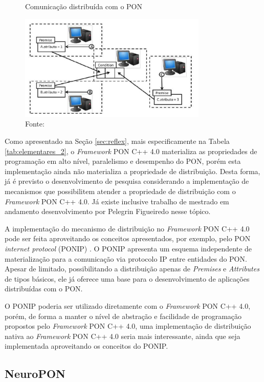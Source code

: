 \begin{figure}[!htb]
\centering
\caption{Comunicação distribuída com o PON}
\includegraphics[width=0.8\textwidth]{../figures/pon_dist.PNG}
\smallskip
\caption*{Fonte: }
\label{fig:pon_dist}
\end{figure}

Como apresentado na Seção \ref{sec:reflex}, mais especificamente na Tabela
\ref{tab:elementares_2}, o \textit{Framework} PON C++ 4.0 materializa as
propriedades de programação em alto nível, paralelismo e desempenho do PON,
porém esta implementação ainda não materializa a propriedade de distribuição.
Desta forma, já é previsto o desenvolvimento de pesquisa considerando a
implementação de mecanismos que possibilitem atender a propriedade de
distribuição com o \textit{Framework} PON C++ 4.0. Já existe inclusive trabalho
de mestrado em andamento desenvolvimento por Pelegrin Figueiredo nesse
tópico.

A implementação do mecanismo de distribuição no \textit{Framework} PON C++ 4.0
pode ser feita aproveitando os conceitos apresentados, por exemplo, pelo PON
\textit{internet protocol} (PONIP) \cite{talau_2016}. O PONIP apresenta um
esquema independente de materialização para a comunicação via protocolo IP entre
entidades do PON. Apesar de limitado, possibilitando a distribuição apenas de
\textit{Premises} e \textit{Attributes} de tipos básicos, ele já oferece uma
base para o desenvolvimento de aplicações distribuídas com o PON.

O PONIP poderia ser utilizado diretamente com o \textit{Framework} PON C++ 4.0,
porém, de forma a manter o nível de abstração e facilidade de programação
propostos pelo \textit{Framework} PON C++ 4.0, uma implementação de distribuição
nativa ao \textit{Framework} PON C++ 4.0 seria mais interessante, ainda que seja
implementada aproveitando os conceitos do PONIP.

\subsection{NeuroPON}\label{sec:neuropon_futuro}

